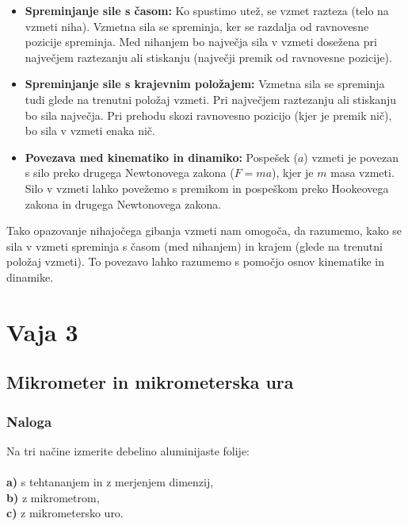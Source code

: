 \documentclass{report}
\begin{document}
    \begin{itemize}
      \item \textbf{Spreminjanje sile s časom:}
        Ko spustimo utež, se vzmet razteza (telo na vzmeti niha). Vzmetna sila se spreminja, ker se razdalja od ravnovesne pozicije spreminja.
        Med nihanjem bo največja sila v vzmeti dosežena pri največjem raztezanju ali stiskanju (največji premik od ravnovesne pozicije).

    \item \textbf{Spreminjanje sile s krajevnim položajem:}
        Vzmetna sila se spreminja tudi glede na trenutni položaj vzmeti. Pri največjem raztezanju ali stiskanju bo sila največja.
        Pri prehodu skozi ravnovesno pozicijo (kjer je premik nič), bo sila v vzmeti enaka nič.

    \item \textbf{Povezava med kinematiko in dinamiko:}
        Pospešek ($a$) vzmeti je povezan s silo preko drugega Newtonovega zakona ($F = ma$), kjer je $m$ masa vzmeti.
        Silo v vzmeti lahko povežemo s premikom in pospeškom preko Hookeovega zakona in drugega Newtonovega zakona.
    \end{itemize}
    

\noindent Tako opazovanje nihajočega gibanja vzmeti nam omogoča, da razumemo, kako se sila v vzmeti spreminja s časom (med nihanjem) in krajem (glede na trenutni položaj vzmeti). To povezavo lahko razumemo s pomočjo osnov kinematike in dinamike.



\chapter{Vaja 3}

\section{Mikrometer in mikrometerska ura}

\subsection{Naloga}

Na tri načine izmerite debelino aluminijaste folije: \\\\
\textbf{a)} s tehtananjem in z merjenjem dimenzij, \\
\textbf{b)} z mikrometrom, \\
\textbf{c)} z mikrometersko uro.
\end{document}
